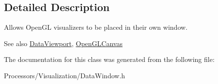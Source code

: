 \subsection{Detailed Description}
Allows Open\-G\-L visualizers to be placed in their own window.

\begin{DoxySeeAlso}{See also}
\hyperlink{classDataViewport}{Data\-Viewport}, \hyperlink{classOpenGLCanvas}{Open\-G\-L\-Canvas} 
\end{DoxySeeAlso}


The documentation for this class was generated from the following file\-:\begin{DoxyCompactItemize}
\item 
Processors/\-Visualization/Data\-Window.\-h\end{DoxyCompactItemize}
